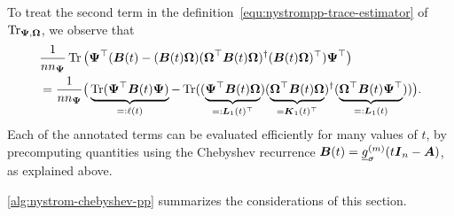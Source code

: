 To treat the second term in the definition~\cref{equ:nystrompp-trace-estimator} of $\operatorname{Tr}_{\boldsymbol{\Psi}, \boldsymbol{\Omega}}$, we observe that 
\begin{align}
    &\frac{1}{n n_{\boldsymbol{\Psi}}} \operatorname{Tr} \big(\boldsymbol{\Psi}^{\top} (\boldsymbol{B}(t) - (\boldsymbol{B}(t) \boldsymbol{\Omega}) (\boldsymbol{\Omega}^{\top} \boldsymbol{B}(t) \boldsymbol{\Omega})^{\dagger} (\boldsymbol{B}(t) \boldsymbol{\Omega})^{\top}) \boldsymbol{\Psi}^{\top} \big) \notag \\
    &= \frac{1}{n n_{\boldsymbol{\Psi}}} \big( \underbrace{\operatorname{Tr}(\boldsymbol{\Psi}^{\top} \boldsymbol{B}(t)\boldsymbol{\Psi})}_{=: \ell(t)} - \operatorname{Tr}((\underbrace{\boldsymbol{\Psi}^{\top} \boldsymbol{B}(t) \boldsymbol{\Omega}}_{=: \boldsymbol{L}_1(t)^{\top}}) (\underbrace{\boldsymbol{\Omega}^{\top} \boldsymbol{B}(t) \boldsymbol{\Omega}}_{= \boldsymbol{K}_1(t)^{\top}})^{\dagger} (\underbrace{\boldsymbol{\Omega}^{\top} \boldsymbol{B}(t) \boldsymbol{\Psi}^{\top}}_{=: \boldsymbol{L}_1(t)})) \big).
    \label{equ:cyclic-property-hutchinson}
\end{align}
Each of the annotated terms can be evaluated efficiently for many values of $t$, by precomputing quantities using the Chebyshev recurrence 
$\boldsymbol{B}(t) = \underline{g}_{\sigma}^{(m)}(t \boldsymbol{I}_n - \boldsymbol{A})$, as explained above.

\cref{alg:nystrom-chebyshev-pp} summarizes the considerations of this section.


